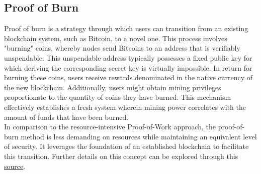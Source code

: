 \documentclass{report}
\begin{document}
\subsection{Proof of Burn}
Proof of burn is a strategy through which users can transition from an existing blockchain system, such as Bitcoin, to a novel one. This process involves "burning" coins, whereby nodes send Bitcoins to an address that is verifiably unspendable. This unspendable address typically possesses a fixed public key for which deriving the corresponding secret key is virtually impossible. In return for burning these coins, users receive rewards denominated in the native currency of the new blockchain. Additionally, users might obtain mining privileges proportionate to the quantity of coins they have burned. This mechanism effectively establishes a fresh system wherein mining power correlates with the amount of funds that have been burned.\\
In comparison to the resource-intensive Proof-of-Work approach, the proof-of-burn method is less demanding on resources while maintaining an equivalent level of security. It leverages the foundation of an established blockchain to facilitate this transition. Further details on this concept can be explored through this \href{https://en.bitcoin.it/wiki/Proof_of_burn}{source}.
\end{document}
